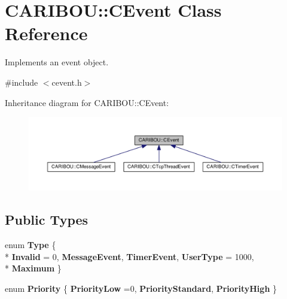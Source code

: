 \section{C\+A\+R\+I\+B\+OU\+:\+:C\+Event Class Reference}
\label{class_c_a_r_i_b_o_u_1_1_c_event}


Implements an event object.  




{\ttfamily \#include $<$cevent.\+h$>$}



Inheritance diagram for C\+A\+R\+I\+B\+OU\+:\+:C\+Event\+:\nopagebreak
\begin{figure}[H]
\begin{center}
\leavevmode
\includegraphics[width=350pt]{class_c_a_r_i_b_o_u_1_1_c_event__inherit__graph}
\end{center}
\end{figure}
\subsection*{Public Types}
\begin{DoxyCompactItemize}
\item 
enum {\bf Type} \{ \\*
{\bf Invalid} = 0, 
{\bf Message\+Event}, 
{\bf Timer\+Event}, 
{\bf User\+Type} = 1000, 
\\*
{\bf Maximum}
 \}
\item 
enum {\bf Priority} \{ {\bf Priority\+Low} =0, 
{\bf Priority\+Standard}, 
{\bf Priority\+High}
 \}
\end{DoxyCompactItemize}
